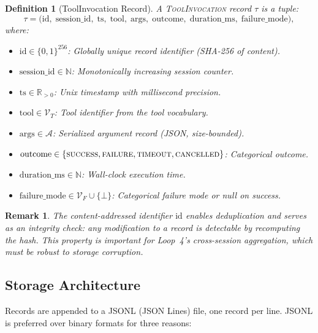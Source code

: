\documentclass[11pt]{article}
\newtheorem{definition}{Definition}
\newtheorem{remark}{Remark}
\begin{document}
\begin{definition}[ToolInvocation Record]
\label{def:tool_invocation}
A \textsc{ToolInvocation} record $\tau$ is a tuple:
\begin{equation}
\tau = \bigl( \text{id},\; \text{session\_id},\; \text{ts},\; \text{tool},\;
              \text{args},\; \text{outcome},\; \text{duration\_ms},\; \text{failure\_mode} \bigr),
\end{equation}
where:
\begin{itemize}[leftmargin=1.5em, nosep]
    \item $\text{id} \in \{0,1\}^{256}$: Globally unique record identifier (SHA-256 of content).
    \item $\text{session\_id} \in \mathbb{N}$: Monotonically increasing session counter.
    \item $\text{ts} \in \mathbb{R}_{>0}$: Unix timestamp with millisecond precision.
    \item $\text{tool} \in \mathcal{V}_T$: Tool identifier from the tool vocabulary.
    \item $\text{args} \in \mathcal{A}$: Serialized argument record (JSON, size-bounded).
    \item $\text{outcome} \in \{\textsc{success}, \textsc{failure}, \textsc{timeout}, \textsc{cancelled}\}$: Categorical outcome.
    \item $\text{duration\_ms} \in \mathbb{N}$: Wall-clock execution time.
    \item $\text{failure\_mode} \in \mathcal{V}_F \cup \{\bot\}$: Categorical failure mode or null on success.
\end{itemize}
\end{definition}

\begin{remark}
The content-addressed identifier $\text{id}$ enables deduplication and serves
as an integrity check: any modification to a record is detectable by recomputing
the hash. This property is important for Loop~4's cross-session aggregation,
which must be robust to storage corruption.
\end{remark}

\subsection{Storage Architecture}

Records are appended to a JSONL (JSON Lines) file, one record per line. JSONL
is preferred over binary formats for three reasons:
\end{document}
